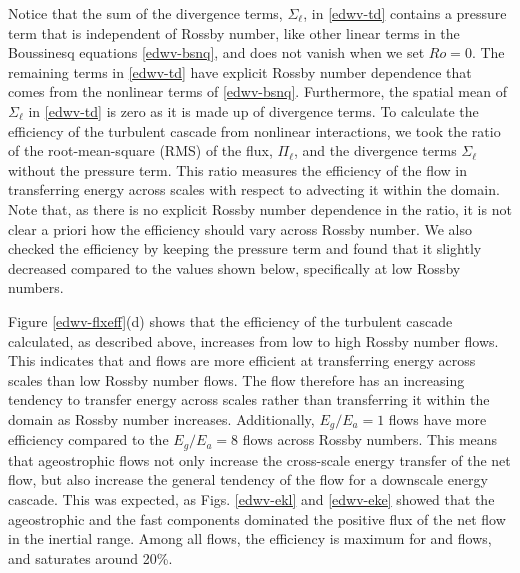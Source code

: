 \documentclass[../Rajarshi-thesis-draft.tex]{subfiles}
\begin{document}
    
    
 Notice that the sum of the divergence terms, $\Sigma_\ell$, in \eqref{edwv-td} contains a pressure term that is independent of Rossby number, like other linear terms in the Boussinesq equations \eqref{edwv-bsnq}, and does not vanish when we set $Ro = 0$. The remaining terms in \eqref{edwv-td} have explicit Rossby number dependence that comes from the nonlinear terms of \eqref{edwv-bsnq}. Furthermore, the spatial mean of $\Sigma_\ell$ in \eqref{edwv-td} is zero as it is made up of divergence terms. To calculate the efficiency of the turbulent cascade from nonlinear interactions, we took the ratio of the root-mean-square (RMS) of the flux, $\Pi_\ell$, and the divergence terms $\Sigma_\ell$ without the pressure term. This ratio measures the efficiency of the flow in transferring energy across scales with respect to advecting it within the domain. Note that, as there is no explicit Rossby number dependence in the ratio, it is not clear a priori how the efficiency should vary across  Rossby number. We also checked the efficiency by keeping the pressure term and found that it slightly decreased compared to the values shown below, specifically at low Rossby numbers. 

Figure \ref{edwv-flxeff}(d) shows that the efficiency of the turbulent cascade calculated, as described above, increases from low to high Rossby number flows. This indicates that \ir and \hr flows are more efficient at transferring energy across scales than low Rossby number \lr flows. The flow therefore has an increasing  tendency to transfer energy across scales rather than transferring it within the domain as   Rossby number increases. Additionally, $E_g/E_a = 1$ flows have more efficiency compared to the $E_g/E_a = 8$ flows across Rossby numbers. This means that ageostrophic flows not only increase the cross-scale energy transfer of the net flow, but also increase the general tendency of the flow for a downscale energy cascade. This was expected, as Figs. \ref{edwv-ekl} and \ref{edwv-eke} showed that the ageostrophic and the fast components dominated the positive flux of the net flow in the inertial range. Among all flows, the efficiency is maximum for \iro and \hro flows, and saturates around 20\%. 
    
\end{document}
